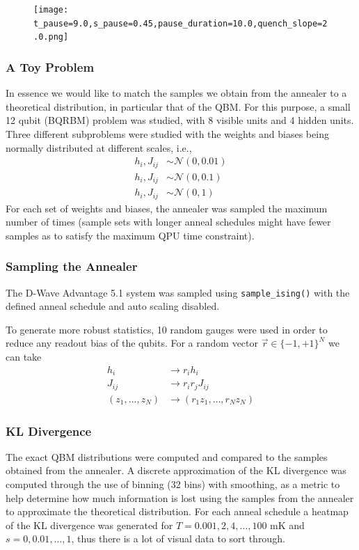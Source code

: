 \documentclass{beamer}
\begin{document}
\begin{frame}
    \begin{figure}
        \texttt{[image: t\_pause=9.0,s\_pause=0.45,pause\_duration=10.0,quench\_slope=2.0.png]}
    \end{figure}
\end{frame}

\begin{frame}
    \frametitle{A Toy Problem}
    In essence we would like to match the samples we obtain from the annealer to a theoretical distribution, in particular that of the QBM.
    For this purpose, a small 12 qubit (BQRBM) problem was studied, with 8 visible units and 4 hidden units.
    Three different subproblems were studied with the weights and biases being normally distributed at different scales, i.e.,
    \begin{align*}
        h_i, J_{ij} &\sim \mathcal{N}(0, 0.01) \\
        h_i, J_{ij} &\sim \mathcal{N}(0, 0.1) \\
        h_i, J_{ij} &\sim \mathcal{N}(0, 1)
    \end{align*}
    For each set of weights and biases, the annealer was sampled the maximum number of times (sample sets with longer anneal schedules might have fewer samples as to satisfy the maximum QPU time constraint).
\end{frame}

\begin{frame}
    \frametitle{Sampling the Annealer}
    The D-Wave Advantage 5.1 system was sampled using \texttt{sample\_ising()} with the defined anneal schedule and auto scaling disabled.

    To generate more robust statistics, 10 random gauges were used in order to reduce any readout bias of the qubits.
    For a random vector \( \vec{r} \in \{-1,+1\}^{N} \) we can take
    \begin{align*}
        h_i &\rightarrow r_i h_i \\
        J_{ij} &\rightarrow r_i r_j J_{ij} \\
        (z_1, \dots, z_N) &\rightarrow (r_1 z_1, \dots, r_N z_N)
    \end{align*}
\end{frame}

\begin{frame}
    \frametitle{KL Divergence}
    The exact QBM distributions were computed and compared to the samples obtained from the annealer.
    A discrete approximation of the KL divergence was computed through the use of binning (32 bins) with smoothing, as a metric to help determine how much information is lost using the samples from the annealer to approximate the theoretical distribution.
    For each anneal schedule a heatmap of the KL divergence was generated for \( T = 0.001, 2, 4, \dots, 100 \) mK and \( s = 0, 0.01, \dots, 1 \), thus there is a lot of visual data to sort through.
\end{frame}
\end{document}
